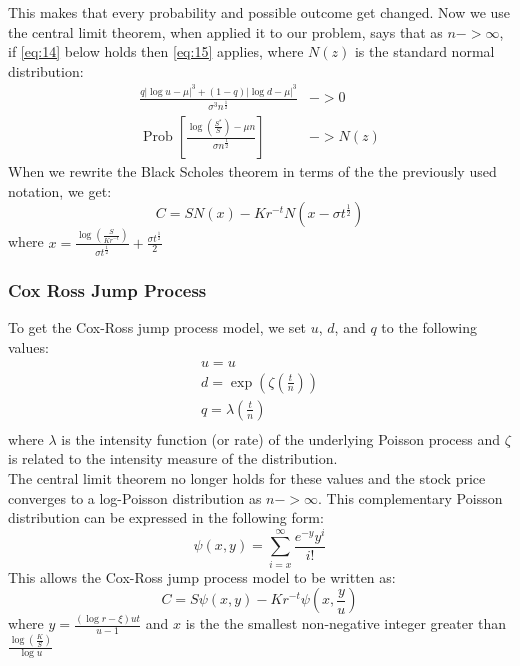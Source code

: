 \documentclass{article}
\DeclareMathOperator{\Prob}{Prob}
\begin{document}
This makes that every probability and possible outcome get changed. Now we use the central limit theorem, when applied it to our problem, says that as $n -> \infty$, if \ref{eq:14} below holds then \ref{eq:15} applies, where $N(z)$ is the standard normal distribution:
\begin{align} \label{eq:14}
    \frac{q|\log u - \mu|^{3} + (1-q)|\log d - \mu|^{3}}{\sigma^{3}n^{\frac{1}{2}}} & -> 0 \\
    \Prob\left[\frac{\log\left(\frac{S^{*}}{S}\right) - \mu n}{\sigma n^{\frac{1}{2}}}\right] & -> N(z) \label{eq:15}
\end{align}
When we rewrite the Black Scholes theorem in terms of the the previously used notation, we get:
\begin{equation}
   C =  S N(x) - K r^{-t} N(x - \sigma t^{\frac{1}{2}})
\end{equation}
where $x = \frac{\log\left(\frac{S}{Kr^{-t}}\right)}{\sigma t^{\frac{1}{2}}} + \frac{\sigma t^{\frac{1}{2}}}{2}$
\subsubsection{Cox Ross Jump Process}
To get the Cox-Ross jump process model, we set $u$, $d$, and $q$ to the following values:
\begin{gather*}
    u = u \\
    d = \exp\left(\zeta \left(\frac{t}{n}\right)\right) \\
    q = \lambda \left(\frac{t}{n}\right) \\
\end{gather*}
where $\lambda$ is the intensity function (or rate) of the underlying Poisson process and $\zeta$ is related to the intensity measure of the distribution.\\
The central limit theorem no longer holds for these values and the stock price converges to a log-Poisson distribution as $n -> \infty$. This complementary Poisson distribution can be expressed in the following form:
\begin{equation}
    \psi (x,y) = \sum_{i=x}^{\infty} \frac{e^{-y}y^{i}}{i!}
\end{equation}
This allows the Cox-Ross jump process model to be written as:
\begin{equation}
    C = S \psi(x,y) - Kr^{-t} \psi\left(x,\frac{y}{u}\right)
\end{equation}
where $y=\frac{(\log r - \xi) u t }{u-1}$ and $x$ is the the smallest non-negative integer greater than $\frac{\log\left(\frac{K}{S}\right)}{\log u}$
\end{document}
